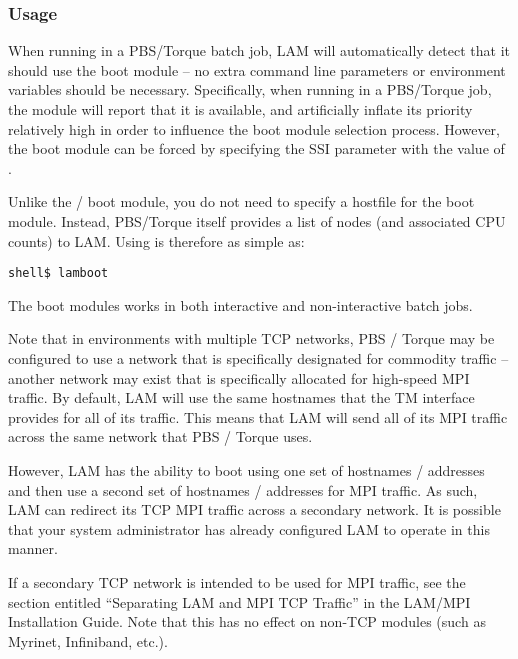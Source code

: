 
\subsubsection{Usage}

When running in a PBS/Torque batch job, LAM will automatically detect
that it should use the  boot module -- no extra command line
parameters or environment variables should be necessary.
%
Specifically, when running in a PBS/Torque job, the  module
will report that it is available, and artificially inflate its
priority relatively high in order to influence the boot module
selection process.
%
However, the  boot module can be forced by specifying the
 SSI parameter with the value of .

Unlike the / boot module, you do not need to specify
a hostfile for the  boot module.  Instead, PBS/Torque itself
provides a list of nodes (and associated CPU counts) to LAM.  Using
 is therefore as simple as:

\lstset{style=lam-cmdline}
\begin{lstlisting}
shell$ lamboot
\end{lstlisting}

The  boot modules works in both interactive and
non-interactive batch jobs.


Note that in environments with multiple TCP networks, PBS / Torque may
be configured to use a network that is specifically designated for
commodity traffic -- another network may exist that is specifically
allocated for high-speed MPI traffic.  By default, LAM will use the
same hostnames that the TM interface provides for all of its traffic.
This means that LAM will send all of its MPI traffic across the same
network that PBS / Torque uses.

However, LAM has the ability to boot using one set of hostnames /
addresses and then use a second set of hostnames / addresses for MPI
traffic.  As such, LAM can redirect its TCP MPI traffic across a
secondary network.  It is possible that your system administrator has
already configured LAM to operate in this manner.

If a secondary TCP network is intended to be used for MPI traffic, see
the section entitled ``Separating LAM and MPI TCP Traffic'' in the
LAM/MPI Installation Guide.  Note that this has no effect on non-TCP
 modules (such as Myrinet, Infiniband, etc.).

